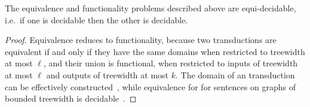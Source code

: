     


\begin{fact}\label{fact:equi-decidable}
    The equivalence and functionality problems described above are equi-decidable, i.e.~if one is decidable then the other is decidable. 
\end{fact}
\begin{proof}
    Equivalence reduces to functionality, because two transductions are  equivalent if and only if they have the same domains when restricted to treewidth at most $\ell$, and their union is  functional, when restricted to inputs of treewidth at most $\ell$ and outputs of treewidth at most $k$.  The domain of an \mso transduction can be effectively constructed~\cite[Backwards Translation Theorem]{courcelleGraphStructureMonadic2012}, while equivalence for \mso for sentences on graphs of bounded treewidth is decidable~\cite[Theorem 5.80]{courcelleGraphStructureMonadic2012}.


\end{proof}
